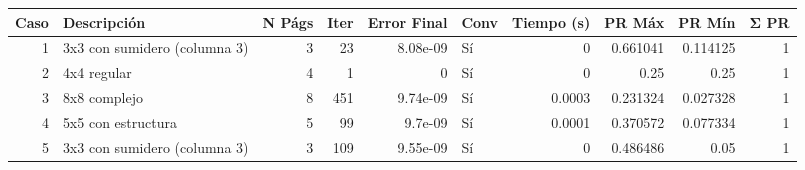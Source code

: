 \begin{tabular}{rlrrrlrrrr}
\toprule
   Caso & Descripción                  &   N Págs &   Iter &   Error Final & Conv   &   Tiempo (s) &   PR Máx &   PR Mín &   Σ PR \\
\midrule
      1 & 3x3 con sumidero (columna 3) &        3 &     23 &      8.08e-09 & Sí     &       0      & 0.661041 & 0.114125 &      1 \\
      2 & 4x4 regular                  &        4 &      1 &      0        & Sí     &       0      & 0.25     & 0.25     &      1 \\
      3 & 8x8 complejo                 &        8 &    451 &      9.74e-09 & Sí     &       0.0003 & 0.231324 & 0.027328 &      1 \\
      4 & 5x5 con estructura           &        5 &     99 &      9.7e-09  & Sí     &       0.0001 & 0.370572 & 0.077334 &      1 \\
      5 & 3x3 con sumidero (columna 3) &        3 &    109 &      9.55e-09 & Sí     &       0      & 0.486486 & 0.05     &      1 \\
\bottomrule
\end{tabular}